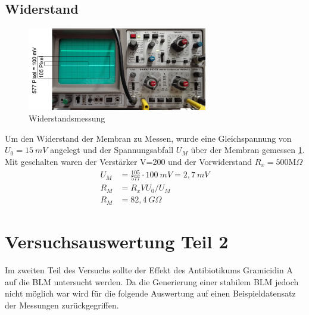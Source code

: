 \documentclass{include/thesisclass3}
\begin{document}
\section{Widerstand}
\begin{figure}[ht]
	\begin{center}
		\includegraphics[width=0.7\textwidth]{images/Widerstand.png}
		\caption{Widerstandsmessung}
		\label{resistance}
	\end{center}
\end{figure}
Um den Widerstand der Membran zu Messen, wurde eine Gleichspannung von $U_0=15~\si{mV}$ angelegt und der Spannungsabfall $U_M$ über der Membran gemessen \ref{resistance}. Mit geschalten waren der Verstärker V=200 und der Vorwiderstand $R_x=500\text{M}\Omega$
\begin{align*}
	U_M&=\frac{105}{577}\cdot 100~\si{mV}= 2,7 ~\si{mV}\\
	R_M&=R_x V U_0/U_M\\
	R_M&=82,4~\si{G\Omega}
\end{align*}

\chapter{Versuchsauswertung Teil 2}
Im zweiten Teil des Versuchs sollte der Effekt des Antibiotikums Gramicidin A auf die BLM untersucht werden. Da die Generierung einer stabilem BLM jedoch nicht möglich war wird für die folgende Auswertung auf einen Beispieldatensatz der Messungen zurückgegriffen.
\end{document}
